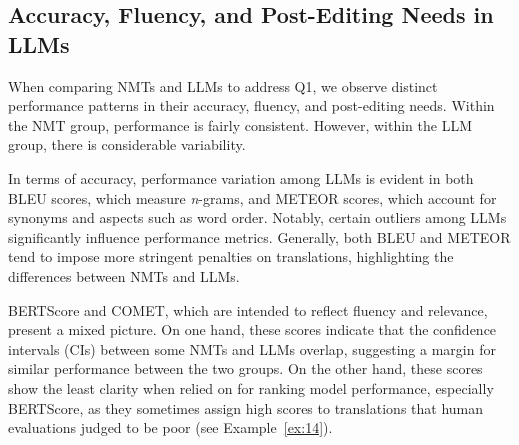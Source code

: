 \subsection{Accuracy, Fluency, and Post-Editing Needs in LLMs}

When comparing NMTs and LLMs to address Q1, we observe distinct performance patterns in their accuracy, fluency, and post-editing needs. Within the NMT group, performance is fairly consistent. However, within the LLM group, there is considerable variability.

In terms of accuracy, performance variation among LLMs is evident in both BLEU scores, which measure \emph{n}-grams, and METEOR scores, which account for synonyms and aspects such as word order. Notably, certain outliers among LLMs significantly influence performance metrics. Generally, both BLEU and METEOR tend to impose more stringent penalties on translations, highlighting the differences between NMTs and LLMs.

BERTScore and COMET, which are intended to reflect fluency and relevance, present a mixed picture. On one hand, these scores indicate that the confidence intervals (CIs) between some NMTs and LLMs overlap, suggesting a margin for similar performance between the two groups. On the other hand, these scores show the least clarity when relied on for ranking model performance, especially BERTScore, as they sometimes assign high scores to translations that human evaluations judged to be poor (see Example~\ref{ex:14}).

